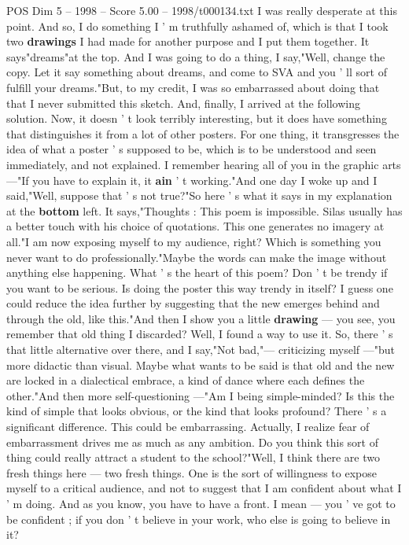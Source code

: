 \begin{textsample}{POS Dim 5 – 1998 – Score 5.00 – 1998/t000134.txt}
I was really desperate at this point.
And so, I do something I ' m truthfully ashamed of, which is that I took two \textbf{drawings} I had made for another purpose and I put them together.
It says"dreams"at the top.
And I was going to do a thing, I say,"Well, change the copy.
Let it say something about dreams, and come to SVA and you ' ll sort of fulfill your dreams."But, to my credit, I was so embarrassed about doing that that I never submitted this sketch.
And, finally, I arrived at the following solution.
Now, it doesn ' t look terribly interesting, but it does have something that distinguishes it from a lot of other posters.
For one thing, it transgresses the idea of what a poster ' s supposed to be, which is to be understood and seen immediately, and not explained.
I remember hearing all of you in the graphic arts —"If you have to explain it, it \textbf{ain} ' t working."And one day I woke up and I said,"Well, suppose that ' s not true?"So here ' s what it says in my explanation at the \textbf{bottom} left.
It says,"Thoughts : This poem is impossible.
Silas usually has a better touch with his choice of quotations.
This one generates no imagery at all."I am now exposing myself to my audience, right?
Which is something you never want to do professionally."Maybe the words can make the image without anything else happening.
What ' s the heart of this poem?
Don ' t be trendy if you want to be serious.
Is doing the poster this way trendy in itself?
I guess one could reduce the idea further by suggesting that the new emerges behind and through the old, like this."And then I show you a little \textbf{drawing} — you see, you remember that old thing I discarded?
Well, I found a way to use it.
So, there ' s that little alternative over there, and I say,"Not bad,"— criticizing myself —"but more didactic than visual.
Maybe what wants to be said is that old and the new are locked in a dialectical embrace, a kind of dance where each defines the other."And then more self-questioning —"Am I being simple-minded?
Is this the kind of simple that looks obvious, or the kind that looks profound?
There ' s a significant difference.
This could be embarrassing.
Actually, I realize fear of embarrassment drives me as much as any ambition.
Do you think this sort of thing could really attract a student to the school?"Well, I think there are two fresh things here — two fresh things.
One is the sort of willingness to expose myself to a critical audience, and not to suggest that I am confident about what I ' m doing.
And as you know, you have to have a front.
I mean — you ' ve got to be confident ; if you don ' t believe in your work, who else is going to believe in it?

\end{textsample}
